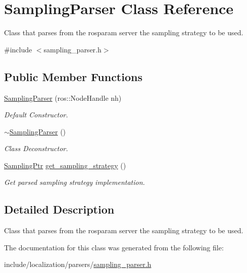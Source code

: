 \hypertarget{classSamplingParser}{\section{Sampling\-Parser Class Reference}
\label{classSamplingParser}
}


Class that parses from the rosparam server the sampling strategy to be used.  




{\ttfamily \#include $<$sampling\-\_\-parser.\-h$>$}

\subsection*{Public Member Functions}
\begin{DoxyCompactItemize}
\item 
\hypertarget{classSamplingParser_a753d77bb855ace7e0b4ef98b59e4721a}{\hyperlink{classSamplingParser_a753d77bb855ace7e0b4ef98b59e4721a}{Sampling\-Parser} (ros\-::\-Node\-Handle nh)}\label{classSamplingParser_a753d77bb855ace7e0b4ef98b59e4721a}

\begin{DoxyCompactList}\small\item\em Default Constructor. \end{DoxyCompactList}\item 
\hypertarget{classSamplingParser_a7d7c0cdba71dbe81494cc409322150c3}{\hyperlink{classSamplingParser_a7d7c0cdba71dbe81494cc409322150c3}{$\sim$\-Sampling\-Parser} ()}\label{classSamplingParser_a7d7c0cdba71dbe81494cc409322150c3}

\begin{DoxyCompactList}\small\item\em Class Deconstructor. \end{DoxyCompactList}\item 
\hypertarget{classSamplingParser_ac9096129452828bd6fde815f68ce1d30}{\hyperlink{sampling_8h_adf4afed667a21b30f8ff816aae609bf7}{Sampling\-Ptr} \hyperlink{classSamplingParser_ac9096129452828bd6fde815f68ce1d30}{get\-\_\-sampling\-\_\-strategy} ()}\label{classSamplingParser_ac9096129452828bd6fde815f68ce1d30}

\begin{DoxyCompactList}\small\item\em Get parsed sampling strategy implementation. \end{DoxyCompactList}\end{DoxyCompactItemize}


\subsection{Detailed Description}
Class that parses from the rosparam server the sampling strategy to be used. 

The documentation for this class was generated from the following file\-:\begin{DoxyCompactItemize}
\item 
include/localization/parsers/\hyperlink{sampling__parser_8h}{sampling\-\_\-parser.\-h}\end{DoxyCompactItemize}
